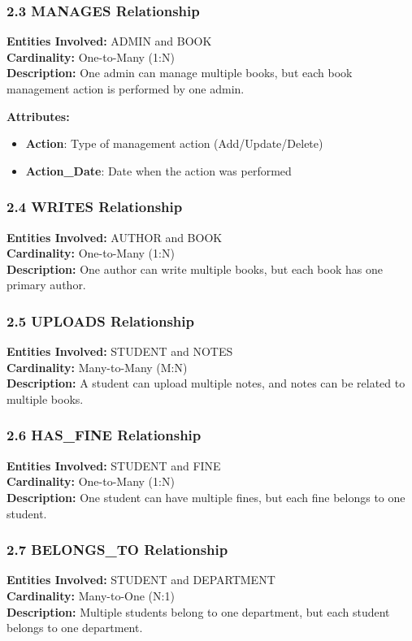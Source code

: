 \documentclass[12pt,a4paper]{article}
\begin{document}
\subsubsection{2.3 MANAGES Relationship}
\textbf{Entities Involved:} ADMIN and BOOK \\
\textbf{Cardinality:} One-to-Many (1:N) \\
\textbf{Description:} One admin can manage multiple books, but each book management action is performed by one admin.

\textbf{Attributes:}
\begin{itemize}
    \item \textbf{Action}: Type of management action (Add/Update/Delete)
    \item \textbf{Action\_Date}: Date when the action was performed
\end{itemize}

\subsubsection{2.4 WRITES Relationship}
\textbf{Entities Involved:} AUTHOR and BOOK \\
\textbf{Cardinality:} One-to-Many (1:N) \\
\textbf{Description:} One author can write multiple books, but each book has one primary author.

\subsubsection{2.5 UPLOADS Relationship}
\textbf{Entities Involved:} STUDENT and NOTES \\
\textbf{Cardinality:} Many-to-Many (M:N) \\
\textbf{Description:} A student can upload multiple notes, and notes can be related to multiple books.

\subsubsection{2.6 HAS\_FINE Relationship}
\textbf{Entities Involved:} STUDENT and FINE \\
\textbf{Cardinality:} One-to-Many (1:N) \\
\textbf{Description:} One student can have multiple fines, but each fine belongs to one student.

\subsubsection{2.7 BELONGS\_TO Relationship}
\textbf{Entities Involved:} STUDENT and DEPARTMENT \\
\textbf{Cardinality:} Many-to-One (N:1) \\
\textbf{Description:} Multiple students belong to one department, but each student belongs to one department.
\end{document}
